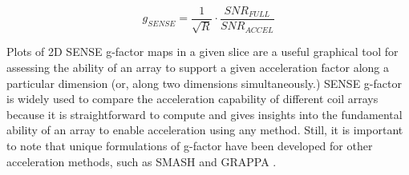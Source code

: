 \begin{equation}\label{eq:SENSE_g}
    g_{SENSE} = \frac{1}{\sqrt{R}} \cdot \frac{SNR_{FULL}}{SNR_{ACCEL}}
\end{equation}

Plots of 2D SENSE g-factor maps in a given slice are a useful graphical tool for assessing the ability of an array to support
a given acceleration factor along a particular dimension (or, along two dimensions simultaneously.) SENSE g-factor is
widely used to compare the acceleration capability of different coil arrays because it is straightforward to compute and
gives insights into the fundamental ability of an array to enable acceleration using any method. Still, it is important
to note that unique formulations of g-factor have been developed for other acceleration methods, such as SMASH and GRAPPA \cite{Breuer2009}.

